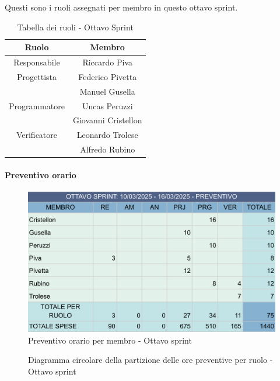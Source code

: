 \documentclass[10pt]{article}
\begin{document}
{{{{{{{{{        Questi sono i ruoli assegnati per membro in questo ottavo sprint.\\
        \begin{table}[H]
            \centering
            \begin{tabular}{|c|c|}
            \hline
            \rowcolor{gray!25}
            \textbf{Ruolo} & \textbf{Membro}\\
            \hline
            Responsabile & Riccardo Piva \\
            \hline
            Progettista & Federico Pivetta \\
            & Manuel Gusella \\
            \hline
            Programmatore & Uncas Peruzzi \\
            & Giovanni Cristellon \\
            \hline
            Verificatore & Leonardo Trolese \\
            & Alfredo Rubino \\
            \hline
            \end{tabular}
            \caption{Tabella dei ruoli - Ottavo Sprint}
        \end{table}

        \paragraph{Preventivo orario}\mbox{}\vspace{0.4em}
        \begin{figure}[H]
            \centering
            \includegraphics[width=0.6\linewidth]{preventivoOreOttavoSprint.png}
            \caption{Preventivo orario per membro - Ottavo sprint}
            \label{fig:Preventivo orario per membro - Ottavo sprint}
        \end{figure}

        \begin{figure}[H]
            \centering
            \caption{Diagramma circolare della partizione delle ore preventive per ruolo - Ottavo sprint}
            \label{fig:Diagramma circolare della partizione delle ore preventive per ruolo - Ottavo sprint}
        \end{figure}
        
}}}}}}}}}
\end{document}
